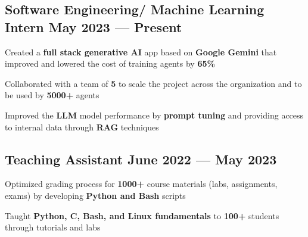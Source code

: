 
\subsection{{Software Engineering/ Machine Learning Intern \hfill May 2023 --- Present}}
\begin{zitemize}
    \item Created a \textbf{full stack generative AI} app based on \textbf{Google Gemini} that improved and lowered the cost of training agents by \textbf{65\%}
    \item Collaborated with a team of \textbf{5} to scale the project across the organization and to be used by \textbf{5000+} agents
    \item Improved the \textbf{LLM} model performance by \textbf{prompt tuning} and providing access to internal data through \textbf{RAG} techniques
\end{zitemize}


\vspace{0.3cm}\subsection{{Teaching Assistant \hfill June 2022 --- May 2023}}
\begin{zitemize}
    \item Optimized grading process for \textbf{1000+} course materials (labs, assignments, exams) by developing \textbf{Python and Bash} scripts
    \item Taught \textbf{Python, C, Bash, and Linux fundamentals} to \textbf{100+} students through tutorials and labs
\end{zitemize}

